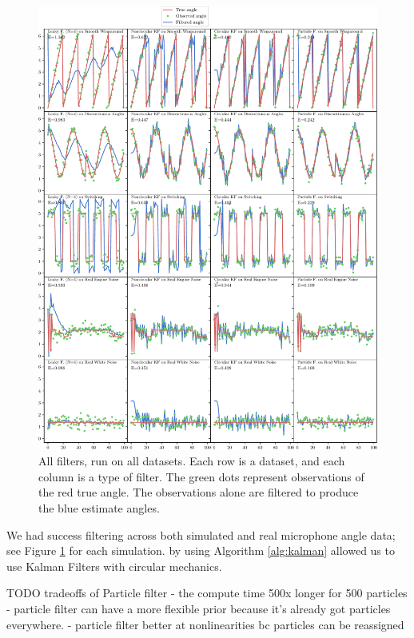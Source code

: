 \documentclass[11pt]{amsart}
\begin{document}
\begin{figure}[htp]
    \centering
    \includegraphics[width=1\textwidth]{actual_paper_graphs/all.pdf}\hfill
    \caption{All filters, run on all datasets. Each row is a dataset, and each column is a type of filter. The green dots represent observations of the red true angle. The observations alone are filtered to produce the blue estimate angles.}
    \label{fig:all_filters}
\end{figure}

We had success filtering across both simulated and real microphone angle data; see Figure \ref{fig:all_filters} for each simulation. by using Algorithm \ref{alg:kalman} allowed us to use Kalman Filters with circular mechanics.


TODO tradeoffs of Particle filter - the compute time 500x longer for 500 particles
- particle filter can have a more flexible prior because it's already got particles everywhere.
- particle filter better at nonlinearities bc particles can be reassigned
\end{document}
